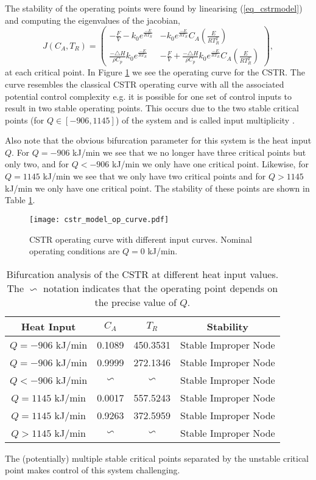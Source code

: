 The stability of the operating points were found by linearising (\ref{eq_cstrmodel}) and computing the eigenvalues of the jacobian,
\begin{equation}
J(C_A, T_R) = \begin{pmatrix}
-\frac{F}{V} - k_0e^{\frac{-E}{RT_R}} & - k_0e^{\frac{-E}{RT_R}}C_A\left(\frac{E}{RT_R^2}\right) \\
\frac{-\triangle H}{\rho C_p}k_0e^{\frac{-E}{RT_R}} & -\frac{F}{V} + \frac{-\triangle H}{\rho C_p}k_0e^{\frac{-E}{RT_R}}C_A\left(\frac{E}{RT_R^2}\right)
\end{pmatrix},
\label{eq_jacobian}
\end{equation}
at each critical point. In Figure \ref{fig_cstr_op_curve} we see the operating curve for the CSTR. The curve resembles the classical CSTR operating curve with all the associated potential control complexity e.g. it is possible for one set of control inputs to result in two stable operating points. This occurs due to the two stable critical points (for $Q\in [-906, 1145]$) of the system and is called input multiplicity \cite{luyben}. 

Also note that the obvious bifurcation parameter for this system is the heat input $Q$. For $Q = -906$ kJ/min we see that we no longer have three critical points but only two, and for $Q < -906$ kJ/min we only have one critical point. Likewise, for $Q = 1145$ kJ/min we see that we only have two critical points and for $Q > 1145$ kJ/min we only have one critical point. The stability of these points are shown in Table \ref{tab_bifurc}.  
\begin{figure}[H] 
\centering
\texttt{[image: cstr\_model\_op\_curve.pdf]}
\caption{CSTR operating curve with different input curves. Nominal operating conditions are $Q=0$ kJ/min.}
\label{fig_cstr_op_curve}
\end{figure}
\begin{table}[H]
\begin{center}
\begin{tabular}{c c c c}
\hline
Heat Input & $C_A$ & $T_R$ & Stability\\
\hline
$Q = -906$ kJ/min & 0.1089 & 450.3531 & Stable Improper Node\\
$Q = -906$ kJ/min & 0.9999 & 272.1346 & Stable Improper Node \\
\hline
$Q < -906$ kJ/min & $\backsim$ & $\backsim$ & Stable Improper Node \\
\hline
$Q = 1145$ kJ/min & 0.0017 & 557.5243 & Stable Improper Node\\
$Q = 1145$ kJ/min & 0.9263 & 372.5959 & Stable Improper Node \\
\hline
$Q > 1145$ kJ/min & $\backsim$ & $\backsim$ & Stable Improper Node \\
\hline
\end{tabular}
\caption{Bifurcation analysis of the CSTR at different heat input values. The $\backsim$ notation indicates that the operating point depends on the precise value of $Q$.}
\label{tab_bifurc}
\end{center}
\end{table}
The (potentially) multiple stable critical points separated by the unstable critical point makes control of this system challenging.    

